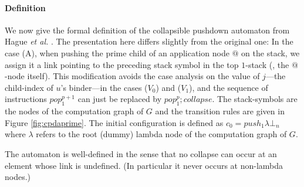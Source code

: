 \documentclass[a4paper,draft]{article}
\theoremstyle{remark}
\theoremstyle{definition}
\begin{document}
\paragraph{Definition}
We now give the formal definition of the collapsible pushdown automaton from Hague \emph{et al.}
\cite{hmos-lics08}. The presentation here differs slightly from the original one: In the case (A), when pushing the prime child of an application node $@$ on the stack, we assign it a link pointing to the preceding stack symbol in the top $1$-stack (\ie, the $@$-node itself).
 This modification avoids the case analysis on the value of $j$---the child-index of $u$'s binder---in the
 cases ($V_0$) and ($V_1$), and the sequence of instructions $pop_1^{p+1}$ can just be replaced by
 $pop_1^p ; collapse$. The stack-symbols are the nodes of the computation graph of $G$ and the transition rules are given in
Figure \ref{fig:cpdaprime}. The initial configuration is defined as $c_0 = push_1 \lambda \bot_n$
where $\lambda$ refers to the root (dummy) lambda node of the computation graph of $G$.

The automaton is well-defined in the sense that no collapse can occur at an element whose link is undefined.
(In particular it never occurs at non-lambda nodes.)

\begin{figure}
\begin{center}
\end{center}
\end{figure}
\end{document}
